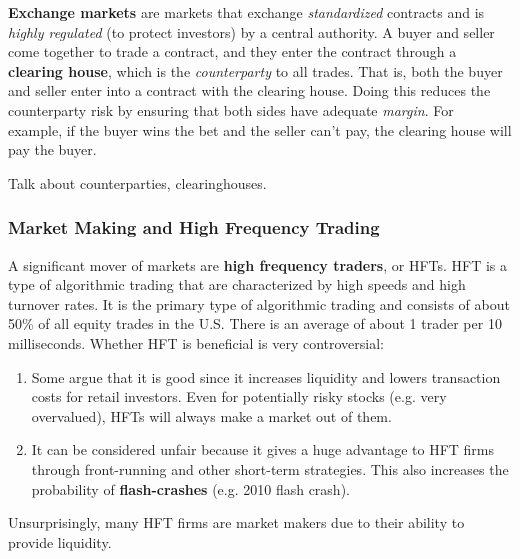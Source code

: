 \documentclass{article}
\begin{document}
    \begin{definition}
      \textbf{Exchange markets} are markets that exchange \textit{standardized} contracts and is \textit{highly regulated} (to protect investors) by a central authority. A buyer and seller come together to trade a contract, and they enter the contract through a \textbf{clearing house}, which is the \textit{counterparty} to all trades. That is, both the buyer and seller enter into a contract with the clearing house. Doing this reduces the counterparty risk by ensuring that both sides have adequate \textit{margin}. For example, if the buyer wins the bet and the seller can't pay, the clearing house will pay the buyer.
    \end{definition}

    \begin{question}
      Talk about counterparties, clearinghouses. 
    \end{question}

    \subsubsection{Market Making and High Frequency Trading}

      A significant mover of markets are \textbf{high frequency traders}, or HFTs. HFT is a type of algorithmic trading that are characterized by high speeds and high turnover rates. It is the primary type of algorithmic trading and consists of about 50\% of all equity trades in the U.S. There is an average of about 1 trader per 10 milliseconds. Whether HFT is beneficial is very controversial: 
      \begin{enumerate}
          \item Some argue that it is good since it increases liquidity and lowers transaction costs for retail investors. Even for potentially risky stocks (e.g. very overvalued), HFTs will always make a market out of them. 
          \item It can be considered unfair because it gives a huge advantage to HFT firms through front-running and other short-term strategies. This also increases the probability of \textbf{flash-crashes} (e.g. 2010 flash crash). 
      \end{enumerate}
      Unsurprisingly, many HFT firms are market makers due to their ability to provide liquidity. 
\end{document}
